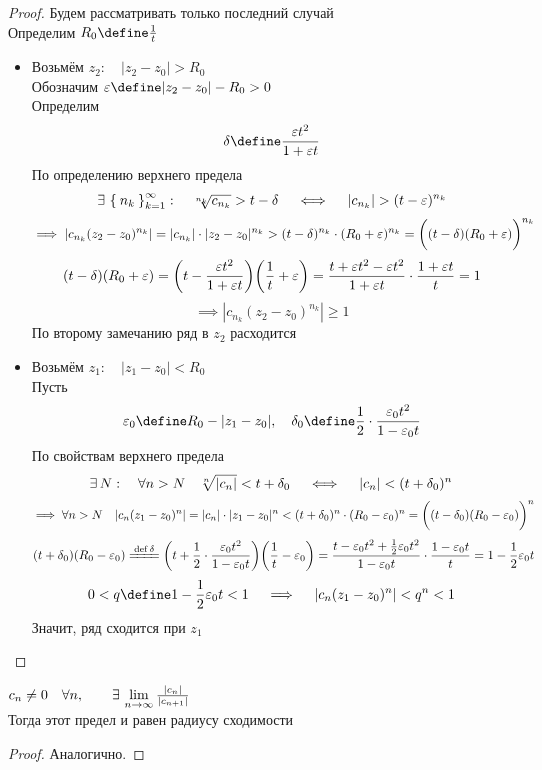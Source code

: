 \begin{proof}
	Будем рассматривать только последний случай \\
	Определим $ R_0 \define \frac1t $
	\begin{itemize}
		\item Возьмём $ z_2 : \quad |z_2 - z_0| > R_0 $ \\
		Обозначим $ \veps \define |z_2 - z_0| - R_0 > 0 $ \\
		Определим
		$$ \delta \define \frac{\veps t^2}{1 + \veps t} $$
		По определению верхнего предела
		$$ \exists\, \Set{n_k}_{k=1}^{\infty} : \quad \sqrt[n_k]{c_{n_k}} > t - \delta \quad \iff \quad |c_{n_k}| > (t - \varepsilon)^{n_k} $$
		$$ \implies |c_{n_k}(z_2 - z_0)^{n_k}| = |c_{n_k}| \cdot |z_2 - z_0|^{n_k} > (t - \delta)^{n_k} \cdot (R_0 + \varepsilon)^{n_k} = \bigg( (t - \delta)(R_0 + \varepsilon) \bigg)^{n_k} $$
		$$ (t - \delta)(R_0 + \varepsilon) = \bigg( t - \frac{\varepsilon t^2}{1 + \varepsilon t} \bigg)\bigg( \frac1t + \varepsilon \bigg) = \frac{t + \varepsilon t^2 - \varepsilon t^2}{1 + \varepsilon t} \cdot \frac{1 + \varepsilon t}t = 1 $$
		$$ \implies |c_{n_k}(z_2 - z_0)^{n_k}| \ge 1 $$
		По второму замечанию ряд в $ z_2 $ расходится
		\item Возьмём $ z_1 : \quad |z_1 - z_0| < R_0 $ \\
		Пусть
		$$ \veps_0 \define R_0 - |z_1 - z_0|, \quad \delta_0 \define \half \cdot \frac{\veps_0t^2}{1 - \veps_0t} $$
		По свойствам верхнего предела
		$$ \exists\, N : \quad \forall n > N \quad \sqrt[n]{|c_n|} < t + \delta_0 \quad \iff \quad |c_n| < (t + \delta_0)^n $$
		$$ \implies \forall n > N \quad |c_n(z_1 - z_0)^n| = |c_n| \cdot |z_1 - z_0|^n < (t + \delta_0)^n \cdot (R_0 - \varepsilon_0)^n = \bigg( (t - \delta_0)(R_0 - \varepsilon_0) \bigg)^n $$
		$$ (t + \delta_0)(R_0 - \veps_0) \bdefeq{\delta} \bigg( t + \half \cdot \frac{\veps_0t^2}{1 - \veps_0t} \bigg) \bigg( \frac1t - \veps_0 \bigg) = \frac{t - \veps_0t^2 + \half\veps_0t^2}{1 - \veps_0t} \cdot \frac{1 - \veps_0t}{t} = 1 - \half\veps_0t $$
		$$ 0 < q \define 1 -\half \veps_0t < 1 \quad \implies \quad |c_n(z_1 - z_0)^n| < q^n < 1 $$
		Значит, ряд сходится при $ z_1 $
	\end{itemize}
\end{proof}

\begin{theorem}
	$ c_n \ne 0 \quad \forall n, \qquad \exists\, \lim\limits_{n\to\infty} \frac{|c_n|}{|c_{n + 1}|} $ \\
	Тогда этот предел и равен радиусу сходимости
\end{theorem}

\begin{proof}
	Аналогично.
\end{proof}

